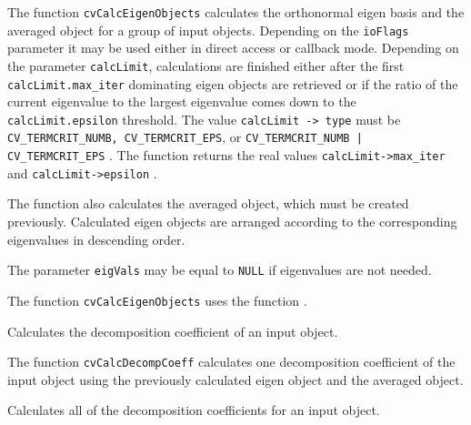 The function \texttt{cvCalcEigenObjects} calculates the orthonormal eigen basis and the averaged object for a group of input objects. Depending on the \texttt{ioFlags} parameter it may be used either in direct access or callback mode. Depending on the parameter \texttt{calcLimit}, calculations are finished either after the first \texttt{calcLimit.max\_iter} dominating eigen objects are retrieved or if the ratio of the current eigenvalue to the largest eigenvalue comes down to the \texttt{calcLimit.epsilon} threshold. The value \texttt{calcLimit -> type} must be \texttt{CV\_TERMCRIT\_NUMB, CV\_TERMCRIT\_EPS}, or \texttt{CV\_TERMCRIT\_NUMB | CV\_TERMCRIT\_EPS} . The function returns the real values \texttt{calcLimit->max\_iter} and \texttt{calcLimit->epsilon} .

The function also calculates the averaged object, which must be created previously. Calculated eigen objects are arranged according to the corresponding eigenvalues in descending order.

The parameter \texttt{eigVals} may be equal to \texttt{NULL} if eigenvalues are not needed.

The function \texttt{cvCalcEigenObjects} uses the function .


Calculates the decomposition coefficient of an input object.


\begin{description}
\end{description}

The function \texttt{cvCalcDecompCoeff} calculates one decomposition coefficient of the input object using the previously calculated eigen object and the averaged object.


Calculates all of the decomposition coefficients for an input object.


